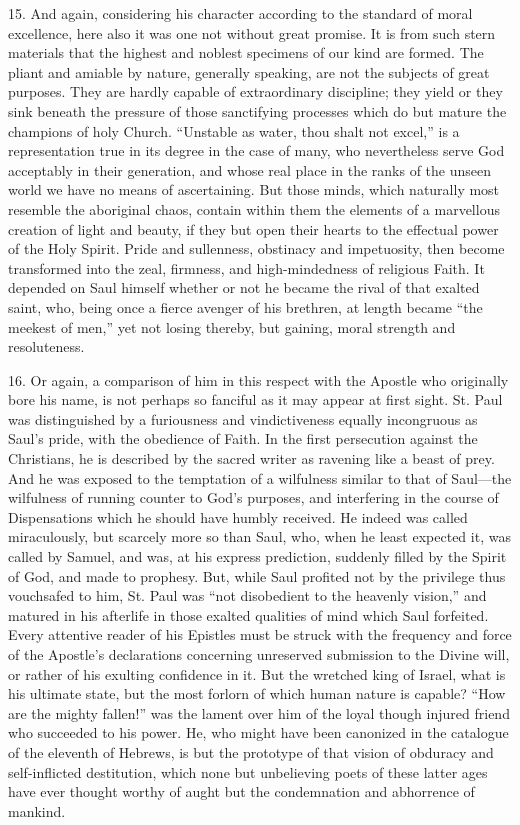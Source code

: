 15. And again, considering his character according to the standard
of moral excellence, here also it was one not without great promise.
It is from such stern materials that the highest and noblest specimens
of our kind are formed. The pliant and amiable by nature, generally
speaking, are not the subjects of great purposes. They are hardly
capable of extraordinary discipline; they yield or they sink beneath
the pressure of those sanctifying processes which do but mature the
champions of holy Church. ``Unstable as water, thou shalt not
excel,'' is a representation true in its degree in the case of
many, who nevertheless serve God acceptably in their generation, and
whose real place in the ranks of the unseen world we have no means of
ascertaining. But those minds, which naturally most resemble the
aboriginal chaos, contain within them the elements of a marvellous
creation of light and beauty, if they but open their hearts to the
effectual power of the Holy Spirit. Pride and sullenness, obstinacy
and impetuosity, then become transformed into the zeal, firmness, and
high-mindedness of religious Faith. It depended on Saul himself
whether or not he became the rival of that exalted saint, who, being
once a fierce avenger of his brethren, at length became ``the
meekest of men,'' yet not losing thereby, but gaining, moral
strength and resoluteness.

16. Or again, a comparison of him in this respect with the Apostle
who originally bore his name, is not perhaps so fanciful as it may
appear at first sight. St. Paul was distinguished by a furiousness and
vindictiveness equally incongruous as Saul's pride, with the obedience
of Faith. In the first persecution against the Christians, he is
described by the sacred writer as ravening like a beast of prey. And
he was exposed to the temptation of a wilfulness similar to that of
Saul—the wilfulness of running counter to God's purposes, and
interfering in the course of Dispensations which he should have humbly
received. He indeed was called miraculously, but scarcely more so than
Saul, who, when he least expected it, was called by Samuel, and was,
at his express prediction, suddenly filled by the Spirit of God, and
made to prophesy. But, while Saul profited not by the privilege thus
vouchsafed to him, St. Paul was ``not disobedient to the heavenly
vision,'' and matured in his afterlife in those exalted qualities
of mind which Saul forfeited. Every attentive reader of his Epistles
must be struck with the frequency and force of the Apostle's
declarations concerning unreserved submission to the Divine will, or
rather of his exulting confidence in it. But the wretched king of
Israel, what is his ultimate state, but the most forlorn of which
human nature is capable? ``How are the mighty fallen!'' was
the lament over him of the loyal though injured friend who succeeded
to his power. He, who might have been canonized in the catalogue of
the eleventh of Hebrews, is but the prototype of that vision of
obduracy and self-inflicted destitution, which none but unbelieving
poets of these latter ages have ever thought worthy of aught but the
condemnation and abhorrence of mankind.

